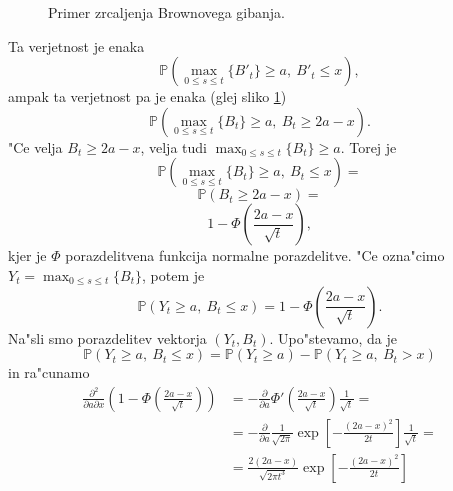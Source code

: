 \documentclass[twoside,11pt]{article}
\begin{document}
\begin{figure}[h]
    \centering
    \caption{Primer zrcaljenja Brownovega gibanja.}
    \label{fig:slika6}
\end{figure}

\pagebreak
\noindent
Ta verjetnost je enaka
$$
    \mathbb{P}\left(\max_{0\leq s\leq t}\{B'_t\}\geq a, \ B'_t \leq x\right),
$$
ampak ta verjetnost pa je enaka (glej sliko \ref{fig:slika6})
$$
    \mathbb{P}\left(\max_{0\leq s\leq t}\{B_t\}\geq a, \ B_t \geq 2a -x\right).
$$
"Ce velja $B_t \geq 2a - x$, velja tudi $\max_{0\leq s\leq t}\{B_t\}\geq a$. Torej je 
$$
    \mathbb{P}\left(\max_{0\leq s \leq t}\{B_t\} \geq a, \ B_t \leq x\right) = 
$$
$$
    \mathbb{P}\left(B_t \geq 2a - x\right) =
$$
$$
    1 - \varPhi\left(\frac{2a - x}{\sqrt{t}}\right),
$$
kjer je $\varPhi$ porazdelitvena funkcija normalne porazdelitve. "Ce ozna"cimo $Y_t = \max_{0\leq s\leq t}\{B_t\}$, potem je 
$$
    \mathbb{P}\left(Y_t \geq a, \ B_t \leq x\right) = 1 - \varPhi\left(\frac{2a - x}{\sqrt{t}}\right).
$$
Na"sli smo porazdelitev vektorja $(Y_t, B_t)$. Upo"stevamo, da je 
$$
    \mathbb{P}\left(Y_t \geq a, \ B_t \leq x\right) = \mathbb{P}\left(Y_t \geq a\right) - \mathbb{P}\left(Y_t \geq a, \ B_t > x\right)
$$
in ra"cunamo
\begin{align*}
    \frac{\partial^2}{\partial a \partial x}\left(1 - \varPhi\left(\frac{2a - x}{\sqrt{t}}\right)\right) &= -\frac{\partial}{\partial a}\varPhi'\left(\frac{2a - x}{\sqrt{t}}\right)\frac{1}{\sqrt{t}} =\\
    &= -\frac{\partial}{\partial a}\frac{1}{\sqrt{2\pi}}\exp\left[-\frac{(2a - x)^2}{2t}\right]\frac{1}{\sqrt{t}} =\\
    &= \frac{2(2a - x)}{\sqrt{2\pi t^3}}\exp\left[-\frac{(2a - x)^2}{2t}\right]
\end{align*}
\end{document}
